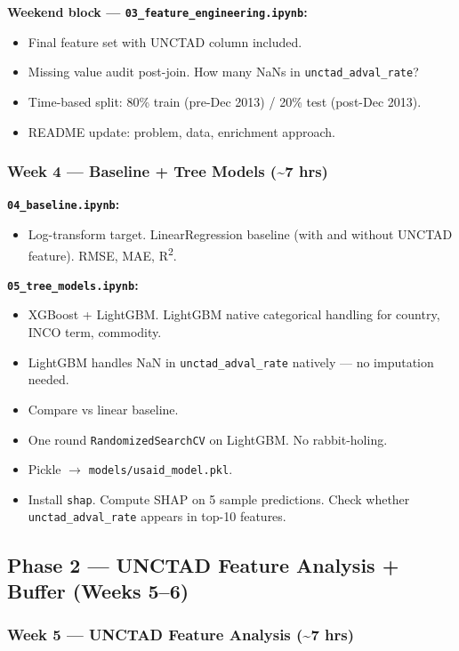 \documentclass[11pt, a4paper]{article}
\begin{document}
\textbf{Weekend block --- \texttt{03\_feature\_engineering.ipynb}:}
\begin{itemize}[noitemsep]
  \item Final feature set with UNCTAD column included.
  \item Missing value audit post-join. How many NaNs in \texttt{unctad\_adval\_rate}?
  \item Time-based split: 80\% train (pre-Dec 2013) / 20\% test (post-Dec 2013).
  \item README update: problem, data, enrichment approach.
\end{itemize}

\subsubsection*{Week 4 --- Baseline + Tree Models (\textasciitilde{}7 hrs)}

\textbf{\texttt{04\_baseline.ipynb}:}
\begin{itemize}[noitemsep]
  \item Log-transform target. LinearRegression baseline (with and without UNCTAD feature). RMSE, MAE, R\textsuperscript{2}.
\end{itemize}

\textbf{\texttt{05\_tree\_models.ipynb}:}
\begin{itemize}[noitemsep]
  \item XGBoost + LightGBM. LightGBM native categorical handling for country, INCO term, commodity.
  \item LightGBM handles NaN in \texttt{unctad\_adval\_rate} natively --- no imputation needed.
  \item Compare vs linear baseline.
  \item One round \texttt{RandomizedSearchCV} on LightGBM. No rabbit-holing.
  \item Pickle $\rightarrow$ \texttt{models/usaid\_model.pkl}.
  \item Install \texttt{shap}. Compute SHAP on 5 sample predictions. Check whether \texttt{unctad\_adval\_rate} appears in top-10 features.
\end{itemize}

\subsection{Phase 2 --- UNCTAD Feature Analysis + Buffer (Weeks 5--6)}

\subsubsection*{Week 5 --- UNCTAD Feature Analysis (\textasciitilde{}7 hrs)}
\end{document}
